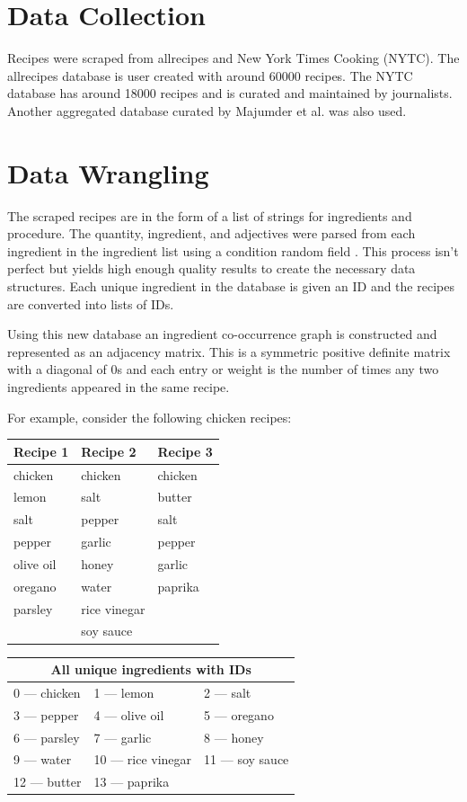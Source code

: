\documentclass[conference]{IEEEtran}
\begin{document}
\section{Data Collection}
Recipes were scraped from allrecipes and New York Times Cooking (NYTC). The allrecipes database is
user created with around 60000 recipes. The NYTC database has around 18000 recipes and is
curated and maintained by journalists. Another aggregated database curated by Majumder et al.
\cite{Majumder19} was also used.

\section{Data Wrangling}
The scraped recipes are in the form of a list of strings for ingredients and procedure.
The quantity, ingredient, and adjectives were parsed from each ingredient in the ingredient
list using a condition random field \cite{mtlynch}.
This process isn't perfect but yields high enough quality results to create the necessary
data structures. Each unique ingredient in the database is given an ID and the recipes are
converted into lists of IDs.

Using this new database an ingredient co-occurrence graph is constructed and represented as an
adjacency matrix. This is a symmetric positive definite matrix with a diagonal of 0s and each
entry or weight is the number of times any two ingredients appeared in the same recipe.

For example, consider the following chicken recipes:

\vspace{.5cm}
\begin{tabular}{ l|l|l }
   Recipe 1    & Recipe 2        & Recipe 3  \\
   \hline
   chicken     & chicken         & chicken   \\
   lemon       & salt            & butter    \\
   salt        & pepper          & salt      \\
   pepper      & garlic          & pepper    \\
   olive oil   & honey           & garlic    \\
   oregano     & water           & paprika   \\
   parsley     & rice vinegar    &           \\
               & soy sauce       &
\end{tabular}

\vspace{.5cm}
\begin{tabular}{ l l l }
   \multicolumn{3}{c}{All unique ingredients with IDs}          \\
   \hline
   0  --- chicken  & 1  --- lemon         & 2  --- salt         \\
   3  --- pepper   & 4  --- olive oil     & 5  --- oregano      \\
   6  --- parsley  & 7  --- garlic        & 8  --- honey        \\
   9  --- water    & 10 --- rice vinegar  & 11 --- soy sauce    \\
   12 --- butter   & 13 --- paprika       &
\end{tabular}
\end{document}
